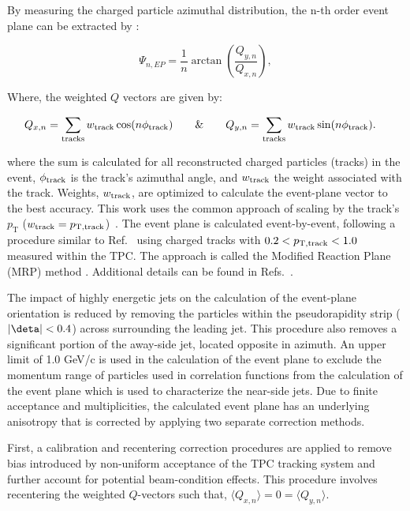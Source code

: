 By measuring the charged particle azimuthal distribution, the n-th order event plane can be extracted by \cite{Poskanzer:1998yz}:  

\begin{equation}
	\Psi_{n,EP} = \frac{1}{n} \arctan \left(\frac{Q_{y, n}}{Q_{x, n}} \right),
	\label{eqn:EP}
\end{equation}

Where, the weighted $Q$ vectors are given by:

\begin{align}
	Q_{x, n} = \sum_{\mathrm{tracks}} w_{\rm track} \cos (n \phi_{\rm track}) \qquad \text{\&} \qquad& Q_{y, n} = \sum_{\mathrm{tracks}} w_{\rm track} \sin (n \phi_{\rm track}).
	\label{Eqn:Qvecs}
\end{align}

\noindent where the sum is calculated for all
reconstructed charged particles (tracks) in the event, $\phi_{\rm track}$ is the track's azimuthal angle, and $w_{\rm track}$ the weight associated with the track.  Weights, $w_{\rm track}$, are optimized to calculate the event-plane vector to the best accuracy. This work uses the common approach of scaling by the track's $p_{\mathrm{T}}$ ($w_{\rm track} = p_{\rm T, track}$)~\cite{Poskanzer:1998yz}.  The event plane is calculated event-by-event, following a procedure similar to Ref.~\cite{CASTILHO2018369} using charged tracks with $0.2 < p_{\rm  T, track} < 1.0$ \GeVc measured within the TPC.  The approach is called the Modified Reaction Plane (MRP) method \cite{Agakishiev:2014ada}.  Additional details can be found in Refs.~\cite{CASTILHO2018369,Adams_2005}.

The impact of highly energetic jets on the calculation of the event-plane orientation is reduced by removing the particles within the pseudorapidity strip ($|\deta|<0.4$) across \dphi surrounding the leading jet.  This procedure also removes a significant portion of the away-side jet, located opposite in azimuth. 
An upper limit of 1.0 GeV/c is used in the calculation of the event plane to exclude the momentum range of particles used in correlation functions from the calculation of the event plane which is used to characterize the near-side jets. Due to finite acceptance and multiplicities, the calculated event plane has an underlying anisotropy that is corrected by applying two separate correction methods.  

First, a calibration and recentering correction procedures are applied to remove bias introduced by non-uniform acceptance of the TPC tracking system and further account for potential beam-condition effects\cite{Barrette:1997pt,PhysRevC.55.1420,Poskanzer:1998yz}.  This procedure involves recentering the weighted $Q$-vectors such that, $\langle Q_{x, n} \rangle = 0 = \langle Q_{y, n} \rangle$.  

